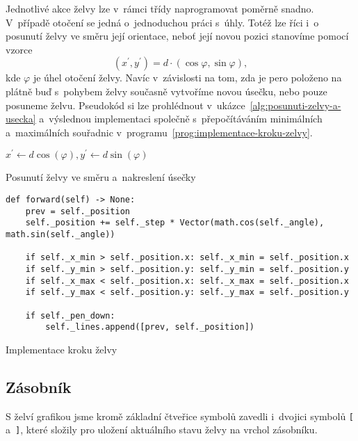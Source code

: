 Jednotlivé akce želvy lze v~rámci třídy naprogramovat poměrně snadno. V~případě otočení se jedná o~jednoduchou práci s~úhly. Totéž lze říci i~o posunutí želvy ve směru její orientace, neboť její novou pozici stanovíme pomocí vzorce
\[(x^\prime,y^\prime)=d\cdot(\cos\varphi,\sin\varphi),\]
kde $\varphi$ je úhel otočení želvy. Navíc v~závislosti na tom, zda je pero položeno na plátně buď s~pohybem želvy současně vytvoříme novou úsečku, nebo pouze posuneme želvu. Pseudokód si lze prohlédnout v~ukázce~\ref{alg:posunuti-zelvy-a-usecka} a~výslednou implementaci společně s~přepočítáváním minimálních a~maximálních souřadnic v~programu~\ref{prog:implementace-kroku-zelvy}.
\begin{algorithm}[h]
    $x^\prime\gets d\cos(\varphi),y^\prime\gets d\sin(\varphi)$\;
    \;
    \caption{Posunutí želvy ve směru a~nakreslení úsečky}
    \label{alg:posunuti-zelvy-a-usecka}
\end{algorithm}
\begin{program}[h]
\begin{lstlisting}[style=python]
def forward(self) -> None:
    prev = self._position
    self._position += self._step * Vector(math.cos(self._angle), math.sin(self._angle))

    if self._x_min > self._position.x: self._x_min = self._position.x
    if self._y_min > self._position.y: self._y_min = self._position.y
    if self._x_max < self._position.x: self._x_max = self._position.x
    if self._y_max < self._position.y: self._y_max = self._position.y

    if self._pen_down:
        self._lines.append([prev, self._position])
\end{lstlisting}
    \caption{Implementace kroku želvy}
    \label{prog:implementace-kroku-zelvy}
\end{program}

\subsection{Zásobník}\label{subsec:zasobnik}

S želví grafikou jsme kromě základní čtveřice symbolů zavedli i~dvojici symbolů \texttt{[} a~\texttt{]}, které složily pro uložení aktuálního stavu želvy na vrchol zásobníku.

